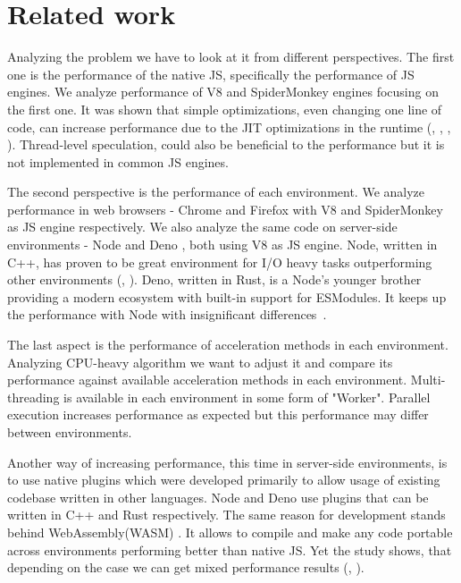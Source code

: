 \section{Related work}
Analyzing the problem we have to look at it from different perspectives. The first one is the performance of the native JS, specifically the performance of JS engines. We analyze performance of V8 and SpiderMonkey engines focusing on the first one. It was shown that simple optimizations, even changing one line of code, can increase performance due to the JIT optimizations in the runtime (\cite{meurer_2017}, \cite{meurer_2019}, \cite{gong2015jitprof}, \cite{selakovic2016performance}). Thread-level speculation, could also be beneficial to the performance \cite{martinsen2017combining} but it is not implemented in common JS engines.

The second perspective is the performance of each environment. We analyze performance in web browsers - Chrome and Firefox with V8 and SpiderMonkey \cite{spidermonkey} as JS engine respectively. We also analyze the same code on server-side environments - Node and Deno \cite{Deno}, both using V8 as JS engine. Node, written in C++, has proven to be great environment for I/O heavy tasks outperforming other environments (\cite{lei2014performance}, \cite{chitra2017performance}). Deno, written in Rust, is a Node's younger brother providing a modern ecosystem with built-in support for ESModules. It keeps up the performance with Node with insignificant differences~\cite{choubey_2021}.

The last aspect is the performance of acceleration methods in each environment. Analyzing CPU-heavy algorithm we want to adjust it and compare its performance against available acceleration methods in each environment. Multi-threading is available in each environment in some form of "Worker". Parallel execution increases performance as expected \cite{djarv2020performance} but this performance may differ between environments. 

Another way of increasing performance, this time in server-side environments, is to use native plugins which were developed primarily to allow usage of existing codebase written in other languages. Node and Deno use plugins that can be written in C++ \cite{cpp_addons} and Rust \cite{logrocket_blog_2021} respectively. The same reason for development stands behind WebAssembly(WASM) \cite{niessen2020webassembly}. It allows to compile and make any code portable across environments performing better than native JS. Yet the study shows, that depending on the case we can get mixed performance results (\cite{yan2021understanding}, \cite{jangda2019not}). 

